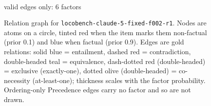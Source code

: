 \documentclass[11pt]{article}
\begin{document}
\begin{figure}[htbp]
\begin{minipage}[t]{0.48\linewidth}
{
}
\\[2pt]{\footnotesize valid edges only: 6 factors}
\end{minipage}
\caption{Relation graph for \texttt{locobench-claude-5-fixed-f002-r1}. Nodes are atoms on a circle, tinted red when the item marks them non-factual (prior 0.1) and blue when factual (prior 0.9). Edges are gold relations: solid blue = entailment, dashed red = contradiction, double-headed teal = equivalence, dash-dotted red (double-headed) = exclusive (exactly-one), dotted olive (double-headed) = co-necessity (at-least-one); thickness scales with the factor probability. Ordering-only Precedence edges carry no factor and so are not drawn.}
\label{fig:graph-locobench-claude-5-fixed-f002-r1}
\end{figure}
\end{document}
